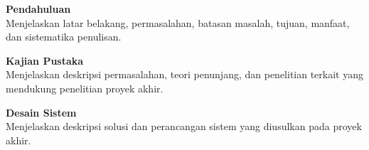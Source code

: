 
\vspace{0.3cm}
\begin{description}[leftmargin=2.2cm, labelsep=0cm, itemsep=0.1cm]
  \item[{\makebox[2.2cm][l]{\textbf{Bab 1}}}] \textbf{Pendahuluan}\\
    Menjelaskan latar belakang, permasalahan, batasan masalah, tujuan, manfaat,
    dan sistematika penulisan.

  \item[{\makebox[2.2cm][l]{\textbf{Bab 2}}}] \textbf{Kajian Pustaka}\\
    Menjelaskan deskripsi permasalahan, teori penunjang, dan penelitian terkait
    yang mendukung penelitian proyek akhir.

  \item[{\makebox[2.2cm][l]{\textbf{Bab 3}}}] \textbf{Desain Sistem}\\
    Menjelaskan deskripsi solusi dan perancangan sistem yang diusulkan pada
    proyek akhir.
\end{description}
